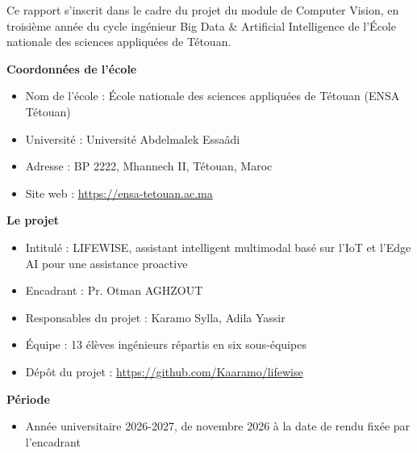 \newcommand{\aRediger}[2]{%
  \begin{tcolorbox}[colback=black!3,colframe=mycolor!60,boxrule=0.4pt,arc=1pt,left=6pt,right=6pt,top=4pt,bottom=4pt]
  \small\textbf{À rédiger par la sous-équipe #1.} #2
  \end{tcolorbox}}

\noindent Ce rapport s'inscrit dans le cadre du projet du module de Computer Vision, en troisième année du cycle
ingénieur Big Data \& Artificial Intelligence de l'École nationale des sciences appliquées de Tétouan.

\vspace{1cm}

\noindent\textcolor{mycolor}{\textbf{Coordonnées de l'école}}

\begin{itemize}
  \item Nom de l'école : École nationale des sciences appliquées de Tétouan (ENSA Tétouan)
  \item Université : Université Abdelmalek Essaâdi
  \item Adresse : BP 2222, Mhannech II, Tétouan, Maroc
  \item Site web : \url{https://ensa-tetouan.ac.ma}
\end{itemize}

\vspace{0.5cm}

\noindent\textcolor{mycolor}{\textbf{Le projet}}

\begin{itemize}
  \item Intitulé : LIFEWISE, assistant intelligent multimodal basé sur l'IoT et l'Edge AI pour une assistance proactive
  \item Encadrant : Pr. Otman AGHZOUT
  \item Responsables du projet : Karamo Sylla, Adila Yassir
  \item Équipe : 13 élèves ingénieurs répartis en six sous-équipes
  \item Dépôt du projet : \url{https://github.com/Kaaramo/lifewise}
\end{itemize}

\vspace{0.5cm}

\noindent\textcolor{mycolor}{\textbf{Période}}

\begin{itemize}
  \item Année universitaire 2026-2027, de novembre 2026 à la date de rendu fixée par l'encadrant
\end{itemize}
